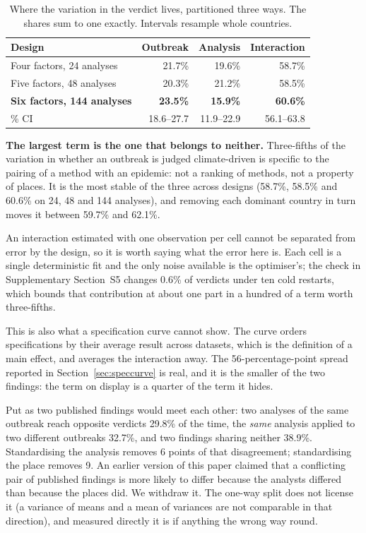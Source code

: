 \documentclass[11pt,a4paper]{article}
\begin{document}
\begin{table}[htbp]
\centering
\caption{Where the variation in the verdict lives, partitioned three ways. The
shares sum to one exactly. Intervals resample whole countries.}
\begin{tabular}{lrrr}
\toprule
Design & Outbreak & Analysis & Interaction \\
\midrule
Four factors, 24 analyses & 21.7\% & 19.6\% & 58.7\% \\
Five factors, 48 analyses & 20.3\% & 21.2\% & 58.5\% \\
\textbf{Six factors, 144 analyses} & \textbf{23.5\%} & \textbf{15.9\%}
  & \textbf{60.6\%} \\
\quad 95\% CI & 18.6--27.7 & 11.9--22.9 & 56.1--63.8 \\
\bottomrule
\end{tabular}
\label{tab:twoway}
\end{table}

\textbf{The largest term is the one that belongs to neither.} Three-fifths of the
variation in whether an outbreak is judged climate-driven is specific to the
pairing of a method with an epidemic: not a ranking of methods, not a property of
places. It is the most stable of the three across designs (58.7\%, 58.5\% and
60.6\% on 24, 48 and 144 analyses), and removing each dominant country in turn
moves it between 59.7\% and 62.1\%.

An interaction estimated with one observation per cell cannot be separated from
error by the design, so it is worth saying what the error here is. Each cell is a
single deterministic fit and the only noise available is the optimiser's; the
check in Supplementary Section~S5 changes 0.6\% of verdicts under ten cold
restarts, which bounds that contribution at about one part in a hundred of a term
worth three-fifths.

This is also what a specification curve cannot show. The curve orders
specifications by their average result across datasets, which is the definition
of a main effect, and averages the interaction away. The 56-percentage-point
spread reported in Section~\ref{sec:speccurve} is real, and it is the smaller of
the two findings: the term on display is a quarter of the term it hides.

Put as two published findings would meet each other: two analyses of the same
outbreak reach opposite verdicts 29.8\% of the time, the \emph{same} analysis
applied to two different outbreaks 32.7\%, and two findings sharing neither
38.9\%. Standardising the analysis removes 6 points of that disagreement;
standardising the place removes 9. An earlier version of this paper claimed that
a conflicting pair of published findings is more likely to differ because the
analysts differed than because the places did. We withdraw it. The one-way split
does not license it (a variance of means and a mean of variances are not
comparable in that direction), and measured directly it is if anything the
wrong way round.
\end{document}
